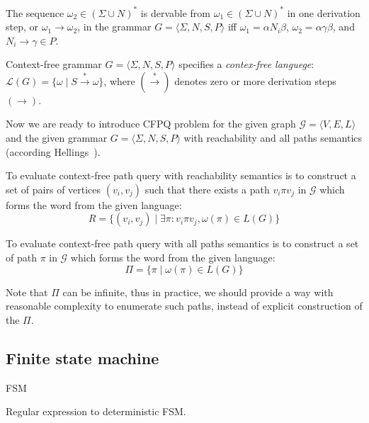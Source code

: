 \begin{definition}
The sequence $\omega_2 \in (\Sigma \cup N)^*$ is dervable from $\omega_1 \in (\Sigma \cup N)^*$ in one derivation step, or $\omega_1 \to \omega_2$, in the grammar $G = \langle\Sigma, N, S, P\rangle$ iff $\omega_1=\alpha N_i \beta$, $\omega_2 = \alpha \gamma \beta$, and $N_i \to \gamma \in P$.
\end{definition}

\begin{definition}
Context-free grammar $G=\langle\Sigma, N, S, P\rangle$ specifies a \textit{contex-free languege}: $\mathcal{L}(G) = \{\omega \mid S \xrightarrow{*} \omega \}$, where $(\xrightarrow{*})$ denotes zero or more derivation steps $(\to)$.    
\end{definition}

Now we are ready to introduce CFPQ problem for the given graph  $\mathcal{G} = \langle V,E,L \rangle$ and the given grammar $G=\langle\Sigma, N, S, P\rangle$ with reachability and all paths semantics (according Hellings~\cite{!!!}).

\begin{definition}
To evaluate context-free path query with reachability semantics is to construct a set of pairs of vertices $(v_i,v_j)$ such that there exists a path $v_i \pi v_j$ in $\mathcal{G}$ which forms the word from the given language:
$$
R = \{(v_i,v_j) \mid \exists \pi: v_i \pi v_j, \omega(\pi) \in L(G) \}
$$
\end{definition}

\begin{definition}
To evaluate context-free path query with all paths semantics is to construct a set of path $\pi$ in $\mathcal{G}$ which forms the word from the given language:
$$
\Pi = \{ \pi \mid \omega(\pi) \in L(G)\}
$$
\end{definition}

Note that $\Pi$ can be infinite, thus in practice, we should provide a way with reasonable complexity to enumerate such paths, instead of explicit construction of the $\Pi$.

\subsection{Finite state machine}

\begin{definition}
FSM
\end{definition}

Regular expression to deterministic FSM.

